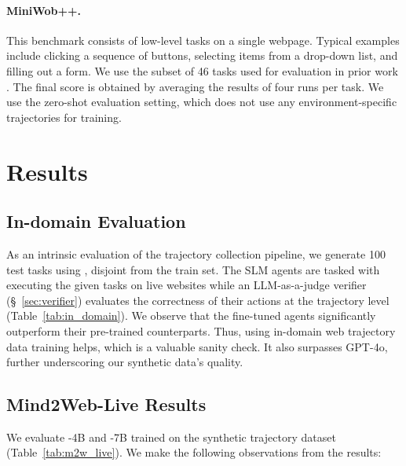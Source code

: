 \paragraph{MiniWob++.} This benchmark consists of low-level tasks on a single webpage.
Typical examples include clicking a sequence of buttons, selecting items from a drop-down list, and filling out a form.
We use the subset of 46 tasks used for evaluation in prior work \cite{DBLP:conf/acl/ZengLLWLD024, Ou2024SynatraTI}.
The final score is obtained by averaging the results of four runs per task.
We use the zero-shot evaluation setting, which does not use any environment-specific trajectories for training. 




\section{Results}


\subsection{In-domain Evaluation}
As an intrinsic evaluation of the trajectory collection pipeline, we generate 100 test tasks using \model, disjoint from the train set.
The SLM agents are tasked with executing the given tasks on live websites while an LLM-as-a-judge verifier (\S~\ref{sec:verifier}) evaluates the correctness of their actions at the trajectory level (Table~\ref{tab:in_domain}).
We observe that the fine-tuned agents significantly outperform their pre-trained counterparts.
Thus, using in-domain web trajectory data training helps, which is a valuable sanity check.
It also surpasses GPT-4o, further underscoring our synthetic data's quality.










\subsection{Mind2Web-Live Results} \label{sec:m2w_live_results}
We evaluate \model-4B and \model-7B trained on the synthetic trajectory dataset (Table~\ref{tab:m2w_live}).
We make the following observations from the results:


